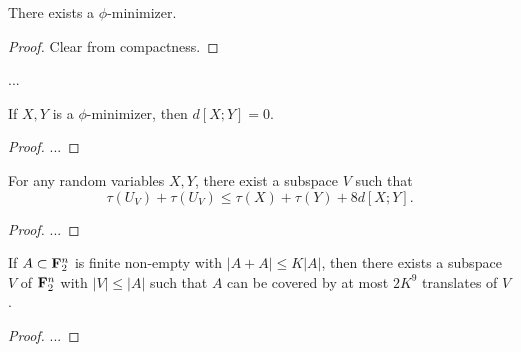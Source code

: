 \begin{lemma}\label{phi-min-exist}  There exists a $\phi$-minimizer.
\end{lemma}

\begin{proof} Clear from compactness.
\end{proof}

...

\begin{proposition}  If $X,Y$ is a $\phi$-minimizer, then $d[X;Y] = 0$.
\end{proposition}

\begin{proof}
  ...
\end{proof}


\begin{proposition}  For any random variables $X,Y$, there exist  a subspace $V$ such that
  $$ \tau(U_V) + \tau(U_V) \leq \tau(X) + \tau(Y) + 8 d[X;Y].$$
\end{proposition}

\begin{proof}
  ...
\end{proof}


\begin{theorem}[PFR with \texorpdfstring{$C=9$}{C=9}]  If $A \subset {\bf F}_2^n$ is finite non-empty with $|A+A| \leq K|A|$, then there exists a subspace $V$ of ${\bf F}_2^n$ with $|V| \leq |A|$ such that $A$ can be covered by at most $2K^9$ translates of $V$.
\end{theorem}

\begin{proof}
  ...
\end{proof}
